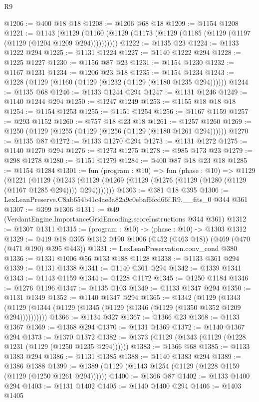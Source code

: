 \begin{lexlean}{R9}
\begin{coremodule}
@1206 := @400 @18 @18
@1208 := @1206 @68 @18
@1209 := @1154 @1208
@1221 := @1143
    (@1129 (@1160 (@1129 (@1173 (@1129 (@1185 (@1129 (@1197 (@1129 (@1204 @1209 @294))))))))))
@1222 := @1135 @23
@1224 := @1133 @1222 @294
@1225 := @1131 @1224
@1227 := @1140 @1222 @294
@1228 := @1225 @1227
@1230 := @1156 @87 @23
@1231 := @1154 @1230
@1232 := @1167 @1231
@1234 := @1206 @23 @18
@1235 := @1154 @1234
@1243 := @1228 (@1129 (@1160 (@1129 (@1232 (@1129 (@1180 @1235 @294))))))
@1244 := @1135 @68
@1246 := @1133 @1244 @294
@1247 := @1131 @1246
@1249 := @1140 @1244 @294
@1250 := @1247 @1249
@1253 := @1155 @18 @18 @18
@1254 := @1154 @1253
@1255 := @1151 @1254
@1256 := @1167 @1159
@1257 := @293 @1152
@1260 := @757 @18 @23 @18
@1261 := @1257 @1260
@1269 := @1250 (@1129 (@1255 (@1129 (@1256 (@1129 (@1180 @1261 @294))))))
@1270 := @1135 @87
@1272 := @1133 @1270 @294
@1273 := @1131 @1272
@1275 := @1140 @1270 @294
@1276 := @1273 @1275
@1278 := @985 @173 @23
@1279 := @298 @1278
@1280 := @1151 @1279
@1284 := @400 @87 @18 @23 @18
@1285 := @1154 @1284
@1301 := fun (program : @10) =>
  fun (phase : @10) =>
  @1129
    (@1221
      (@1129
        (@1243 (@1129 (@1269 (@1129 (@1276 (@1129 (@1280 (@1129 (@1167 @1285 @294)))) @294)))))))
@1303 := @381 @18 @395
@1306 := LexLeanPreserve.C8ab654b41c4ae3a82a9c0ebaf6fcd66f.R9.__fits_0 @344 @361
@1307 := @399 @1306
@1311 := @49 (VerdantEngine.ImportanceGridEncoding.scoreInstructions @344 @361)
@1312 := @1307 @1311
@1315 := (program : @10) -> (phase : @10) -> @1303 @1312
@1329 := @419 @18 @395 @1312 @190 @1006 (@452 (@463 @18)) (@469 (@470 (@471 @190) @395 @443))
@1331 := LexLeanPreservation.conv_cond @380
@1336 := @1331 @1006 @56 @133 @188 @1128
@1338 := @1133 @361 @294
@1339 := @1131 @1338
@1341 := @1140 @361 @294
@1342 := @1339 @1341
@1343 := @1143 @1159
@1344 := @1228 @1172
@1345 := @1250 @1184
@1346 := @1276 @1196
@1347 := @1135 @103
@1349 := @1133 @1347 @294
@1350 := @1131 @1349
@1352 := @1140 @1347 @294
@1365 := @1342
    (@1129 (@1343 (@1129 (@1344 (@1129 (@1345 (@1129 (@1346 (@1129 (@1350 @1352 @1209 @294))))))))))
@1366 := @1134 @327
@1367 := @1366 @23
@1368 := @1133 @1367
@1369 := @1368 @294
@1370 := @1131 @1369
@1372 := @1140 @1367 @294
@1373 := @1370 @1372
@1382 := @1373 (@1129 (@1343 (@1129 (@1228 @1231 (@1129 (@1250 @1235 @294))))))
@1383 := @1366 @68
@1385 := @1133 @1383 @294
@1386 := @1131 @1385
@1388 := @1140 @1383 @294
@1389 := @1386 @1388
@1399 := @1389 (@1129 (@1143 @1254 (@1129 (@1228 @1159 (@1129 (@1250 @1261 @294))))))
@1400 := @1366 @87
@1402 := @1133 @1400 @294
@1403 := @1131 @1402
@1405 := @1140 @1400 @294
@1406 := @1403 @1405

\end{coremodule}
\end{lexlean}
